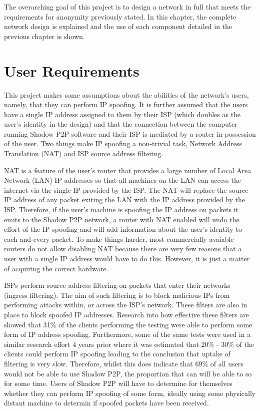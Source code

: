\documentclass[ %
                    author={Luke Murray},
                supervisor={Dr. Simon Hollis},
                     title={Shadow Peer-to-Peer Networks},
                  subtitle={},
                    degree={MEng},
                      year={2013} ]{thesis}
\begin{document}
The overarching goal of this project is to design a network in full that meets the requirements for anonymity previously stated. In this chapter, the complete network design is explained and the use of each component detailed in the previous chapter is shown.

\section{User Requirements}

This project makes some assumptions about the abilities of the network's users, namely, that they can perform IP spoofing. It is further assumed that the users have a single IP address assigned to them by their ISP (which doubles as the user's identity in the design) and that the connection between the computer running Shadow P2P software and their ISP is mediated by a router in possession of the user. Two things make IP spoofing a non-trivial task, Network Address Translation (NAT) and ISP source address filtering.

NAT is a feature of the user's router that provides a large number of Local Area Network (LAN) IP addresses so that all machines on the LAN can access the internet via the single IP provided by the ISP. The NAT will replace the source IP address of any packet exiting the LAN with the IP address provided by the ISP. Therefore, if the user's machine is spoofing the IP address on packets it emits to the Shadow P2P network, a router with NAT enabled will undo the effort of the IP spoofing and will add information about the user's identity to each and every packet. To make things harder, most commercially avaiable routers do not allow disabling NAT because there are very few reasons that a user with a single IP address would have to do this. However, it is just a matter of acquiring the correct hardware.

ISPs perform source address filtering on packets that enter their networks (ingress filtering). The aim of such filtering is to block malicious IPs from performing attacks within, or across the ISP's network. These filters are also in place to block spoofed IP addresses. Research into how effective these filters are showed that 31\% of the clients performing the testing were able to perform some form of IP address spoofing\cite{beverly2009understanding}. Furthermore, some of the same tests were used in a similar research effort 4 years prior\cite{bb-spoofer-sruti} where it was estimated that 20\% - 30\% of the clients could perform IP spoofing leading to the conclusion that uptake of filtering is very slow. Therefore, whilst this does indicate that 69\% of all users would not be able to use Shadow P2P, the proportion that can will be able to so for some time. Users of Shadow P2P will have to determine for themselves whether they can perform IP spoofing of some form, ideally using some physically distant machine to determin if spoofed packets have been received.
\end{document}
